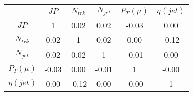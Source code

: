 \begin{tabular}{|c|c|c|c|c|c|} 
\hline
 & $JP$ & $N_{trk}$ & $N_{jet}$ & $P_{T} (\mu)$ & $\eta (jet)$ \\ \hline
$JP$ & 1 & 0.02 & 0.02 & -0.03 & 0.00 \\
$N_{trk}$ & 0.02 & 1 & 0.02 & 0.00 & -0.12 \\
$N_{jet}$ & 0.02 & 0.02 & 1 & -0.01 & 0.00 \\
$P_{T} (\mu)$ & -0.03 & 0.00 & -0.01 & 1 & -0.00 \\
$\eta (jet)$ & 0.00 & -0.12 & 0.00 & -0.00 & 1 \\
\hline 
\end{tabular} 


